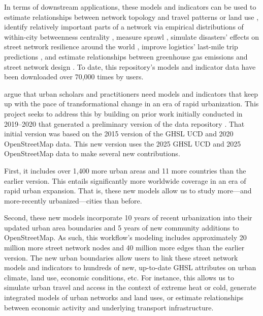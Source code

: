 \documentclass[12pt,letterpaper]{article} %
\begin{document}
In terms of downstream applications, these models and indicators can be used to estimate relationships between network topology and travel patterns or land use \citep{wang_road_2020,wang_street_2018}, identify relatively important parts of a network via empirical distributions of within-city betweenness centrality \citep{barthelemy_universal_2025}, measure sprawl \citep{gervasoni_calculating_2017}, simulate disasters' effects on street network resilience around the world \citep{boeing_resilient_2024}, improve logistics' last-mile trip predictions \citep{merchan_quantifying_2020}, and estimate relationships between greenhouse gas emissions and street network design \citep{boeing_urban_2024}. To date, this repository's models and indicator data have been downloaded over 70,000 times by users.

\citet{dyer_commentary_2024} argue that urban scholars and practitioners need models and indicators that keep up with the pace of transformational change in an era of rapid urbanization. This project seeks to address this by building on prior work initially conducted in 2019--2020 that generated a preliminary version of the data repository \citep{boeing_street_2022}. That initial version was based on the 2015 version of the GHSL UCD and 2020 OpenStreetMap data. This new version uses the 2025 GHSL UCD and 2025 OpenStreetMap data to make several new contributions.

First, it includes over 1,400 more urban areas and 11 more countries than the earlier version. This entails significantly more worldwide coverage in an era of rapid urban expansion. That is, these new models allow us to study more---and more-recently urbanized---cities than before.

Second, these new models incorporate 10 years of recent urbanization into their updated urban area boundaries and 5 years of new community additions to OpenStreetMap. As such, this workflow's modeling includes approximately 20 million more street network nodes and 40 million more edges than the earlier version. The new urban boundaries allow users to link these street network models and indicators to hundreds of new, up-to-date GHSL attributes on urban climate, land use, economic conditions, etc. For instance, this allows us to simulate urban travel and access in the context of extreme heat or cold, generate integrated models of urban networks and land uses, or estimate relationships between economic activity and underlying transport infrastructure.
\end{document}
